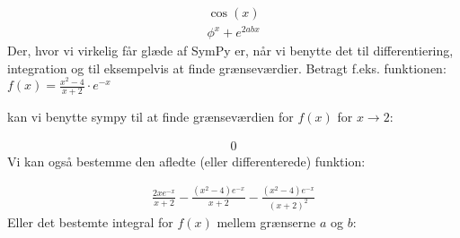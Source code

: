 \documentclass[letterpaper,10pt,english]{jupyterBook}
\begin{document}
\begin{sphinxVerbatim}[commandchars=\\\{\}]
                       
      
\end{sphinxVerbatim}
\begin{equation*}
\begin{split}\displaystyle \cos{\left(x \right)}\end{split}
\end{equation*}\begin{equation*}
\begin{split}\displaystyle \phi^{x} + e^{2 a b x}\end{split}
\end{equation*}
Der, hvor vi virkelig får glæde af SymPy er, når vi benytte det til differentiering, integration og til eksempelvis at finde grænseværdier. Betragt f.eks. funktionen:\( f(x) = \frac{x^2 - 4}{x + 2} \cdot e^{-x}\)

kan vi benytte sympy til at finde grænseværdien for \(f(x)\) for \(x \rightarrow 2\):

\begin{sphinxVerbatim}[commandchars=\\\{\}]
   
         
  
\end{sphinxVerbatim}
\begin{equation*}
\begin{split}\displaystyle 0\end{split}
\end{equation*}
Vi kan også bestemme den afledte (eller differenterede) funktion:

\begin{sphinxVerbatim}[commandchars=\\\{\}]
 
\end{sphinxVerbatim}
\begin{equation*}
\begin{split}\displaystyle \frac{2 x e^{- x}}{x + 2} - \frac{\left(x^{2} - 4\right) e^{- x}}{x + 2} - \frac{\left(x^{2} - 4\right) e^{- x}}{\left(x + 2\right)^{2}}\end{split}
\end{equation*}
Eller det bestemte integral for \(f(x)\) mellem grænserne \(a\) og \(b\):
\end{document}
